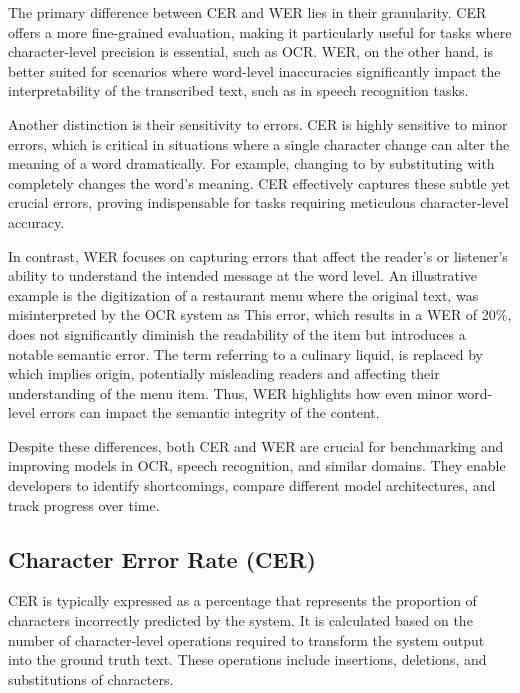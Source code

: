 The primary difference between CER and WER lies in their granularity. CER offers a more fine-grained evaluation, making it particularly useful for tasks where character-level precision is essential, such as OCR. WER, on the other hand, is better suited for scenarios where word-level inaccuracies significantly impact the interpretability of the transcribed text, such as in speech recognition tasks.

Another distinction is their sensitivity to errors. CER is highly sensitive to minor errors, which is critical in situations where a single character change can alter the meaning of a word dramatically. For example, changing  to  by substituting  with  completely changes the word's meaning. CER effectively captures these subtle yet crucial errors, proving indispensable for tasks requiring meticulous character-level accuracy.

In contrast, WER focuses on capturing errors that affect the reader's or listener's ability to understand the intended message at the word level. An illustrative example is the digitization of a restaurant menu where the original text,  was misinterpreted by the OCR system as  This error, which results in a WER of 20\%, does not significantly diminish the readability of the item but introduces a notable semantic error. The term  referring to a culinary liquid, is replaced by  which implies origin, potentially misleading readers and affecting their understanding of the menu item. Thus, WER highlights how even minor word-level errors can impact the semantic integrity of the content.

Despite these differences, both CER and WER are crucial for benchmarking and improving models in OCR, speech recognition, and similar domains. They enable developers to identify shortcomings, compare different model architectures, and track progress over time.

\subsection{Character Error Rate (CER)}
\label{subsec:5_cer}
CER is typically expressed as a percentage that represents the proportion of characters incorrectly predicted by the system. It is calculated based on the number of character-level operations required to transform the system output into the ground truth text. These operations include insertions, deletions, and substitutions of characters.

